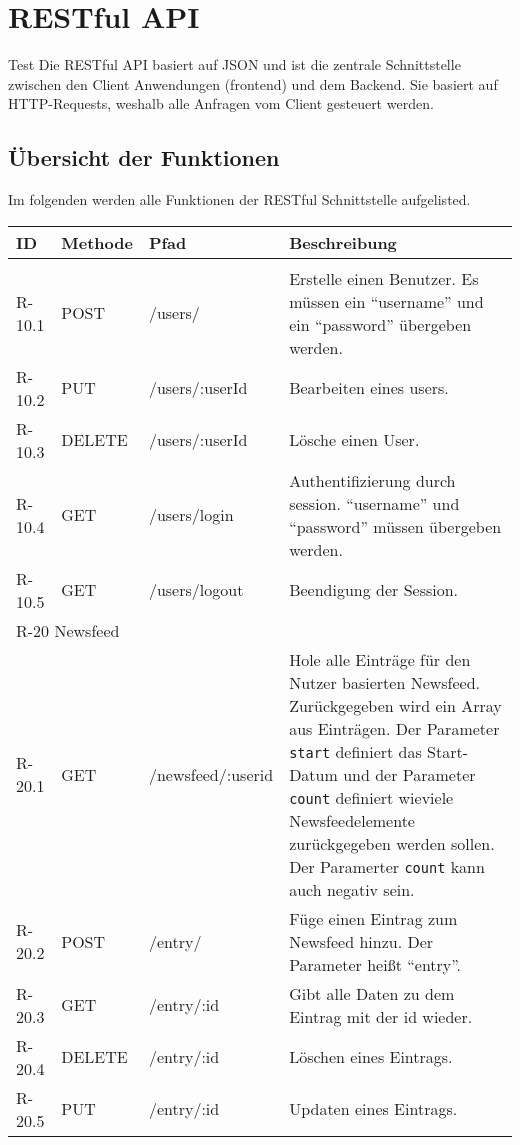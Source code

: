 \chapter{RESTful API}
Test
Die RESTful API basiert auf JSON und ist die zentrale Schnittstelle zwischen den Client Anwendungen (frontend) und dem Backend.
Sie basiert auf HTTP-Requests, weshalb alle Anfragen vom Client gesteuert werden.

\section{Übersicht der Funktionen}
Im folgenden werden alle Funktionen der RESTful Schnittstelle aufgelisted. 
\begin{tabularx}{\textwidth}{|l|l|l|X|}
    \toprule
    \textbf{ID} & \textbf{Methode} & \textbf{Pfad} & \textbf{Beschreibung} \\
    \midrule
    \endhead
    \hline
    \caption{RESTful Pfade}
    \label{RESTful:pfade}
    \endfoot

    \multicolumn{4}{|l|}{R-10 Userverwaltung}\\
    \hline

    R-10.1 & POST & /users/ & Erstelle einen Benutzer. Es müssen ein \enquote{username} und ein \enquote{password} übergeben werden.\\
    R-10.2 & PUT & /users/:userId & Bearbeiten eines users.\\
    R-10.3 & DELETE & /users/:userId & Lösche einen User.\\
    R-10.4 & GET & /users/login & Authentifizierung durch session. \enquote{username} und \enquote{password} müssen übergeben werden.\\
    R-10.5 & GET & /users/logout & Beendigung der Session.\\

    \hline
    \multicolumn{4}{|l|}{R-20 Newsfeed}\\
    \hline

    R-20.1 & GET & /newsfeed/:userid & Hole alle Einträge für den Nutzer basierten Newsfeed. Zurückgegeben wird ein Array aus Einträgen. Der Parameter \verb+start+ definiert das Start-Datum und der Parameter \verb+count+ definiert wieviele Newsfeedelemente zurückgegeben werden sollen. Der Paramerter \verb+count+ kann auch negativ sein.\\ 
    R-20.2 & POST & /entry/ & Füge einen Eintrag zum Newsfeed hinzu. Der Parameter heißt \enquote{entry}.\\ 
    R-20.3 & GET & /entry/:id & Gibt alle Daten zu dem Eintrag mit der id wieder.\\
    R-20.4 & DELETE & /entry/:id & Löschen eines Eintrags.\\
    R-20.5 & PUT & /entry/:id & Updaten eines Eintrags.\\


\end{tabularx}
